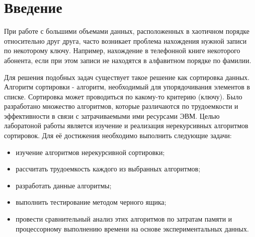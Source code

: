 \chapter*{Введение}
При работе с большими объемами данных, расположенных в хаотичном порядке относительно друг друга, часто возникает проблема нахождения нужной записи по некоторому ключу. Например, нахождение в телефонной книге некоторого абонента, если при этом записи не находятся в алфавитном порядке по фамилии.

Для решения подобных задач существует такое решение как сортировка данных. Алгоритм сортировки - алгоритм, необходимый для упорядочивания элементов в списке. Сортировка может проводиться по какому-то критерию (ключу). Было разработано множество алгоритмов, которые различаются по трудоемкости и эффективности в связи с затрачиваемыми ими ресурсами ЭВМ.
Целью лаборатоной работы является изучение и реализация нерекурсивных алгоритмов сортировок. Для её достижения необходимо выполнить следующие задачи:
\begin{itemize}
	\item изучение алгоритмов нерекурсивной сортировки;
	\item рассчитать трудоемкость каждого из выбранных алгоритмов;
	\item разработать данные алгоритмы;
	\item выполнить тестирование методом черного ящика;
	\item провести сравнительный анализ этих алгоритмов по затратам памяти и процессорному выполнению времени на основе экспериментальных данных.
\end{itemize}